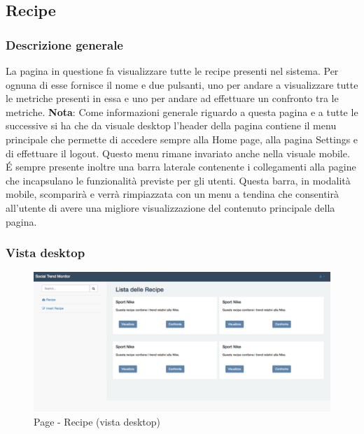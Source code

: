 	\subsection{Recipe} %
	\label{sub:recipe}
		\subsubsection{Descrizione generale} %
		La pagina in questione fa visualizzare tutte le recipe presenti nel sistema. Per ognuna di esse fornisce il nome e due pulsanti, uno per andare a visualizzare tutte le metriche presenti in essa e uno per andare ad effettuare un confronto tra le metriche. \newline
		\textbf{Nota}: Come informazioni generale riguardo a questa pagina e a tutte le successive si ha che da visuale desktop l'header della pagina contiene il menu principale che permette di accedere sempre alla Home page, alla pagina Settings e di effettuare il logout. Questo menu rimane invariato anche nella visuale mobile. \newline
		\'E sempre presente inoltre una barra laterale contenente i collegamenti alla pagine che incapsulano le funzionalità previste per gli utenti. Questa barra, in modalità mobile, scomparirà e verrà rimpiazzata con un menu a tendina che consentirà all'utente di avere una migliore visualizzazione del contenuto principale della pagina.

		\subsubsection{Vista desktop} %
		\begin{figure}[htbp]
			\centering
			\centerline{\includegraphics[scale=0.4]{./images/mockup/recipe_vd.pdf}}
			\caption{Page - Recipe (vista desktop)}
		\end{figure}

